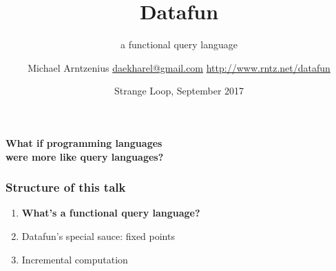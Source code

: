 \documentclass[xcolor=table]{beamer}
\title{Datafun}
\subtitle{a functional query language}
\author{Michael Arntzenius
  \newline\href{mailto:daekharel@gmail.com}{daekharel@gmail.com}
  \newline\url{http://www.rntz.net/datafun}}
\date{Strange Loop, September 2017}
\begin{document}
\maketitle


\begin{frame}\LARGE
  \center \textbf{What if programming languages\\
    were more like query languages?}
\end{frame}

\begin{frame}\Large
  \frametitle{Structure of this talk}
  \begin{enumerate}
    \itemsep 1.5em
  \item {\bf What's a functional query language?}
  \item Datafun's special sauce: fixed points
  \item Incremental computation
  \end{enumerate}
\end{frame}








\end{document}
